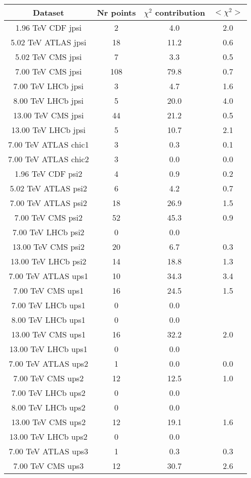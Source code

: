 \begin{table}[h!]
\centering
\begin{tabular}{c|c|c|c}
Dataset & Nr points & $\chi^2$ contribution & $<\chi^2>$ \\
\hline
1.96 TeV CDF jpsi & 2 & 4.0 & 2.0 \\
5.02 TeV ATLAS jpsi & 18 & 11.2 & 0.6 \\
5.02 TeV CMS jpsi & 7 & 3.3 & 0.5 \\
7.00 TeV CMS jpsi & 108 & 79.8 & 0.7 \\
7.00 TeV LHCb jpsi & 3 & 4.7 & 1.6 \\
8.00 TeV LHCb jpsi & 5 & 20.0 & 4.0 \\
13.00 TeV CMS jpsi & 44 & 21.2 & 0.5 \\
13.00 TeV LHCb jpsi & 5 & 10.7 & 2.1 \\
7.00 TeV ATLAS chic1 & 3 & 0.3 & 0.1 \\
7.00 TeV ATLAS chic2 & 3 & 0.0 & 0.0 \\
1.96 TeV CDF psi2 & 4 & 0.9 & 0.2 \\
5.02 TeV ATLAS psi2 & 6 & 4.2 & 0.7 \\
7.00 TeV ATLAS psi2 & 18 & 26.9 & 1.5 \\
7.00 TeV CMS psi2 & 52 & 45.3 & 0.9 \\
7.00 TeV LHCb psi2 & 0 & 0.0 &  \\
13.00 TeV CMS psi2 & 20 & 6.7 & 0.3 \\
13.00 TeV LHCb psi2 & 14 & 18.8 & 1.3 \\
7.00 TeV ATLAS ups1 & 10 & 34.3 & 3.4 \\
7.00 TeV CMS ups1 & 16 & 24.5 & 1.5 \\
7.00 TeV LHCb ups1 & 0 & 0.0 &  \\
8.00 TeV LHCb ups1 & 0 & 0.0 &  \\
13.00 TeV CMS ups1 & 16 & 32.2 & 2.0 \\
13.00 TeV LHCb ups1 & 0 & 0.0 &  \\
7.00 TeV ATLAS ups2 & 1 & 0.0 & 0.0 \\
7.00 TeV CMS ups2 & 12 & 12.5 & 1.0 \\
7.00 TeV LHCb ups2 & 0 & 0.0 &  \\
8.00 TeV LHCb ups2 & 0 & 0.0 &  \\
13.00 TeV CMS ups2 & 12 & 19.1 & 1.6 \\
13.00 TeV LHCb ups2 & 0 & 0.0 &  \\
7.00 TeV ATLAS ups3 & 1 & 0.3 & 0.3 \\
7.00 TeV CMS ups3 & 12 & 30.7 & 2.6 \\

\end{tabular}
\end{table}
